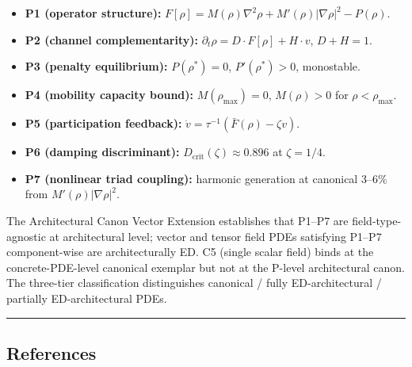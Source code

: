 \documentclass[
]{article}
\providecommand{\tightlist}{%
  \setlength{\itemsep}{0pt}\setlength{\parskip}{0pt}}
\begin{document}
\begin{itemize}
\tightlist
\item
  \textbf{P1 (operator structure):}
  \(F[\rho] = M(\rho)\nabla^2\rho + M'(\rho)|\nabla\rho|^2 - P(\rho)\).
\item
  \textbf{P2 (channel complementarity):}
  \(\partial_t \rho = D \cdot F[\rho] + H \cdot v\), \(D + H = 1\).
\item
  \textbf{P3 (penalty equilibrium):} \(P(\rho^*) = 0\),
  \(P'(\rho^*) > 0\), monostable.
\item
  \textbf{P4 (mobility capacity bound):} \(M(\rho_\mathrm{max}) = 0\),
  \(M(\rho) > 0\) for \(\rho < \rho_\mathrm{max}\).
\item
  \textbf{P5 (participation feedback):}
  \(\dot v = \tau^{-1}(\bar F(\rho) - \zeta v)\).
\item
  \textbf{P6 (damping discriminant):}
  \(D_\mathrm{crit}(\zeta) \approx 0.896\) at \(\zeta = 1/4\).
\item
  \textbf{P7 (nonlinear triad coupling):} harmonic generation at
  canonical 3--6\% from \(M'(\rho)|\nabla\rho|^2\).
\end{itemize}

The Architectural Canon Vector Extension establishes that P1--P7 are
field-type-agnostic at architectural level; vector and tensor field PDEs
satisfying P1--P7 component-wise are architecturally ED. C5 (single
scalar field) binds at the concrete-PDE-level canonical exemplar but not
at the P-level architectural canon. The three-tier classification
distinguishes canonical / fully ED-architectural / partially
ED-architectural PDEs.

\begin{center}\rule{0.5\linewidth}{0.5pt}\end{center}

\subsection{References}\label{references}
\end{document}
